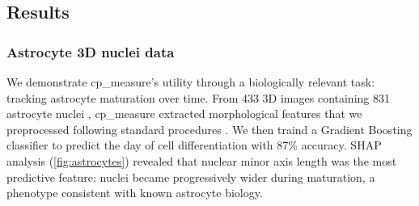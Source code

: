 \documentclass{article}
\begin{document}
\subsection{Results}
\label{sec:orge5b5c6b}
\subsubsection{Astrocyte 3D nuclei data}
\label{sec:org447090b}


We demonstrate cp\_measure's utility through a biologically relevant task: tracking astrocyte maturation over time. 
From 433 3D images containing 831 astrocyte nuclei \citep{kalininValproicAcidinducedChanges2021}, cp\_measure extracted morphological features  that we preprocessed following standard procedures \citep{caicedoDataanalysisStrategiesImagebased2017}.
We then traind a Gradient Boosting classifier to predict the day of cell differentiation with 87\% accuracy. 
SHAP analysis \citep{sundararajanManyShapleyValues2020} (\ref{fig:astrocytes}) revealed that nuclear minor axis length was the most predictive feature: nuclei became progressively wider during maturation, a phenotype consistent with known astrocyte biology.
\end{document}
